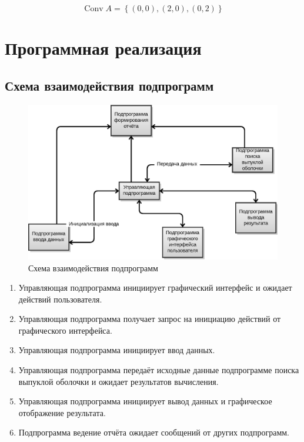 \documentclass[a4paper,12pt,notitlepage,headsepline,pdftex]{scrartcl}
\begin{document}
        \begin{equation*}
          \mathop{Conv} A = \left\{ (0, 0), (2, 0), (0, 2) \right\}
        \end{equation*}

  \newpage
\section{Программная реализация}
  \subsection{Схема взаимодействия подпрограмм}
    \begin{figure}[h]
      \caption{Схема взаимодействия подпрограмм}
      \includegraphics{scheme.eps}
    \end{figure}

    \begin{enumerate}
      \item Управляющая подпрограмма инициирует графический интерфейс и ожидает
        действий пользователя.
      \item Управляющая подпрограмма получает запрос на инициацию действий от
        графического интерфейса.
      \item Управляющая подпрограмма инициирует ввод данных.
      \item Управляющая подпрограмма передаёт исходные данные подпрограмме поиска
        выпуклой оболочки и ожидает результатов вычисления.
      \item Управляющая подпрограмма инициирует вывод данных и графическое
        отображение результата.
      \item Подпрограмма ведение отчёта ожидает сообщений от других подпрограмм.
    \end{enumerate}
\end{document}
